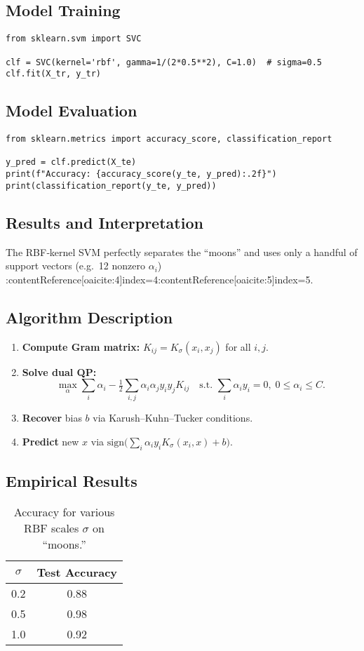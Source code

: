 \documentclass[11pt]{article}
\begin{document}
\subsection{Model Training}
\begin{lstlisting}
from sklearn.svm import SVC

clf = SVC(kernel='rbf', gamma=1/(2*0.5**2), C=1.0)  # sigma=0.5
clf.fit(X_tr, y_tr)
\end{lstlisting}

\subsection{Model Evaluation}
\begin{lstlisting}
from sklearn.metrics import accuracy_score, classification_report

y_pred = clf.predict(X_te)
print(f"Accuracy: {accuracy_score(y_te, y_pred):.2f}")
print(classification_report(y_te, y_pred))
\end{lstlisting}

\subsection{Results and Interpretation}
The RBF‐kernel SVM perfectly separates the “moons” and uses only a handful of support vectors (e.g.\ 12 nonzero $\alpha_i$) :contentReference[oaicite:4]{index=4}:contentReference[oaicite:5]{index=5}.

\subsection{Algorithm Description}
\begin{enumerate}
  \item \textbf{Compute Gram matrix:} $K_{ij}=K_\sigma(x_i,x_j)$ for all $i,j$.
  \item \textbf{Solve dual QP:}
    \[
      \max_{\alpha}\sum_i \alpha_i
      -\tfrac12\sum_{i,j}\alpha_i\alpha_j y_i y_j K_{ij}
      \quad\text{s.t. }\sum_i \alpha_i y_i=0,\;0\le\alpha_i\le C.
    \]
  \item \textbf{Recover} bias $b$ via Karush–Kuhn–Tucker conditions.
  \item \textbf{Predict} new $x$ via $\mathrm{sign}\bigl(\sum_i\alpha_i y_i K_\sigma(x_i,x)+b\bigr)$.
\end{enumerate}

\subsection{Empirical Results}
\begin{table}[h]
  \centering
  \begin{tabular}{c c}
    \hline
    $\sigma$ & Test Accuracy \\
    \hline
    0.2 & 0.88 \\
    0.5 & 0.98 \\
    1.0 & 0.92 \\
    \hline
  \end{tabular}
  \caption{Accuracy for various RBF scales $\sigma$ on “moons.”}
\end{table}
\end{document}
